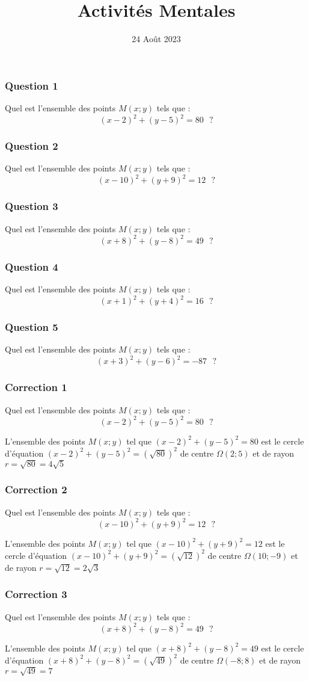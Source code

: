 \documentclass[15pt, mathserif]{beamer}
\title{Activités Mentales}
\date{24 Août 2023}
\begin{document}
\begin{frame}
    \titlepage
\end{frame}

\begin{frame} 
	\frametitle{Question 1}
Quel est l'ensemble des points $M(x;y)$ tels que :$$(x-2)^2+(y-5)^2 =80 \text{~~?} $$\end{frame}


\begin{frame} 
	\frametitle{Question 2}
Quel est l'ensemble des points $M(x;y)$ tels que :$$(x-10)^2+(y+9)^2 =12 \text{~~?} $$\end{frame}


\begin{frame} 
	\frametitle{Question 3}
Quel est l'ensemble des points $M(x;y)$ tels que :$$(x+8)^2+(y-8)^2 =49 \text{~~?} $$\end{frame}


\begin{frame} 
	\frametitle{Question 4}
Quel est l'ensemble des points $M(x;y)$ tels que :$$(x+1)^2+(y+4)^2 =16 \text{~~?} $$\end{frame}


\begin{frame} 
	\frametitle{Question 5}
Quel est l'ensemble des points $M(x;y)$ tels que :$$(x+3)^2+(y-6)^2 =-87 \text{~~?} $$\end{frame}


\begin{frame}
\vspace{-10mm}
	\frametitle{Correction 1}
Quel est l'ensemble des points $M(x;y)$ tels que :$$(x-2)^2+(y-5)^2 =80 \text{~~?} $$ 
 
 \bigskip 
 L'ensemble des points $M(x; y)$ tel que $(x-2)^2+(y-5)^2 =80$ est le cercle d'équation $(x-2)^2+(y-5)^2 =\left(\sqrt{80}\right)^2$ de centre $\Omega(2;5)$ et de rayon $r =\sqrt{80}=4\sqrt{5}$\end{frame}


\begin{frame}
\vspace{-10mm}
	\frametitle{Correction 2}
Quel est l'ensemble des points $M(x;y)$ tels que :$$(x-10)^2+(y+9)^2 =12 \text{~~?} $$ 
 
 \bigskip 
 L'ensemble des points $M(x; y)$ tel que $(x-10)^2+(y+9)^2 =12$ est le cercle d'équation $(x-10)^2+(y+9)^2 =\left(\sqrt{12}\right)^2$ de centre $\Omega(10;-9)$ et de rayon $r =\sqrt{12}=2\sqrt{3}$\end{frame}


\begin{frame}
\vspace{-10mm}
	\frametitle{Correction 3}
Quel est l'ensemble des points $M(x;y)$ tels que :$$(x+8)^2+(y-8)^2 =49 \text{~~?} $$ 
 
 \bigskip 
 L'ensemble des points $M(x; y)$ tel que $(x+8)^2+(y-8)^2 =49$ est le cercle d'équation $(x+8)^2+(y-8)^2 =\left(\sqrt{49}\right)^2$ de centre $\Omega(-8;8)$ et de rayon $r =\sqrt{49}=7$\end{frame}
\end{document}
